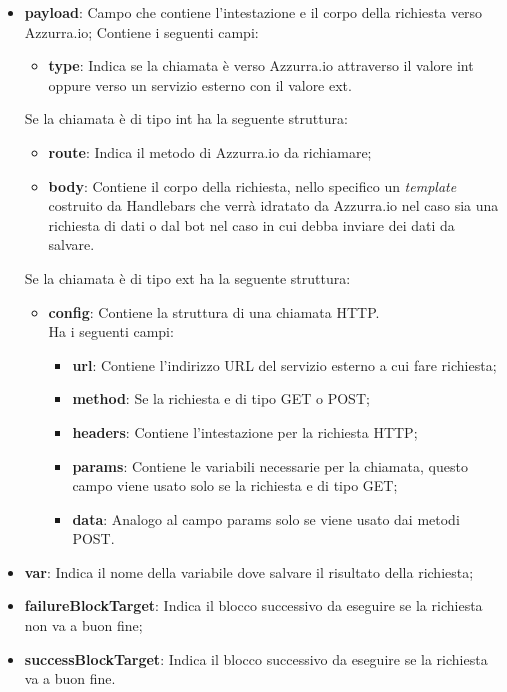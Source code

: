 \begin{itemize}
	\item \textbf{payload}: Campo che contiene l'intestazione e il corpo della richiesta verso Azzurra.io;
	Contiene i seguenti campi:
	\begin{itemize}
		\item \textbf{type}: Indica se la chiamata è verso Azzurra.io attraverso il valore \textsf{int} oppure verso un servizio esterno con il valore \textsf{ext}.
	\end{itemize}
	Se la chiamata è di tipo int ha la seguente struttura:
	\begin{itemize}
		\item \textbf{route}: Indica il metodo di Azzurra.io da richiamare;
		\item \textbf{body}: Contiene il corpo della richiesta, nello specifico un \emph{template} costruito da Handlebars che verrà idratato da Azzurra.io nel caso sia una richiesta di dati o dal \gls{bot}\ap{[g]} nel caso in cui debba inviare dei dati da salvare.
	\end{itemize}
	Se la chiamata è di tipo ext ha la seguente struttura:
	\begin{itemize}
		\item \textbf{config}: Contiene la struttura di una chiamata HTTP.\\
		Ha i seguenti campi:
		\begin{itemize}
			\item \textbf{url}: Contiene l'indirizzo URL del servizio esterno a cui fare richiesta;
			\item \textbf{method}: Se la richiesta e di tipo GET o POST;
			\item \textbf{headers}: Contiene l'intestazione per la richiesta HTTP;
			\item \textbf{params}: Contiene le variabili necessarie per la chiamata, questo campo viene usato solo se la richiesta e di tipo GET;
			\item \textbf{data}: Analogo al campo params solo se viene usato dai metodi POST.
		\end{itemize}
	\end{itemize}
	\item \textbf{var}: Indica il nome della variabile dove salvare il risultato della richiesta;
	\item \textbf{failureBlockTarget}: Indica il blocco successivo da eseguire se la richiesta non va a buon fine;
	\item \textbf{successBlockTarget}: Indica il blocco successivo da eseguire se la richiesta va a buon fine.
\end{itemize}

